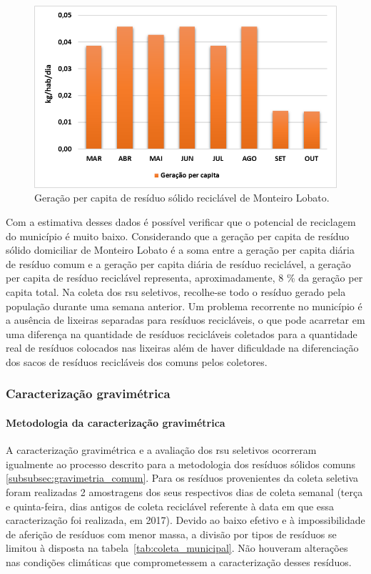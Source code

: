 	\begin{figure}
		\centering
		\includegraphics[width=0.75\linewidth]{produtos/prodtres/image049}
		\caption{Geração per capita de resíduo sólido reciclável de Monteiro Lobato.}
		\label{fig:image049}
	\end{figure}
	
	
	Com a estimativa desses dados é possível verificar que o potencial de reciclagem do município é muito baixo. Considerando que a geração per capita de resíduo sólido domiciliar de Monteiro Lobato é a soma entre a geração per capita diária de resíduo comum e a geração per capita diária de resíduo reciclável, a geração per capita de resíduo reciclável representa, aproximadamente, 8 \% da geração per capita total.
	Na coleta dos \gls{rsu} seletivos, recolhe-se todo o resíduo gerado pela população durante uma semana anterior. Um problema recorrente no município é a ausência de lixeiras separadas para resíduos recicláveis, o que pode acarretar em uma diferença na quantidade de resíduos recicláveis coletados para a quantidade real de resíduos colocados nas lixeiras além de haver dificuldade na diferenciação dos sacos de resíduos recicláveis dos comuns pelos coletores.
	
	\subsubsection{Caracterização gravimétrica}
	
	\paragraph{\textbf{Metodologia da caracterização gravimétrica}}
	
	A caracterização gravimétrica e a avaliação dos \gls{rsu} seletivos ocorreram igualmente ao processo descrito para a metodologia dos resíduos sólidos comuns \ref{subsubsec:gravimetria_comum}. Para os resíduos provenientes da coleta seletiva foram realizadas 2 amostragens dos seus respectivos dias de coleta semanal (terça e quinta-feira, dias antigos de coleta reciclável referente à data em que essa caracterização foi realizada, em 2017). Devido ao baixo efetivo e à impossibilidade de aferição de resíduos com menor massa, a divisão por tipos de resíduos se limitou à disposta na tabela~\ref{tab:coleta_municipal}. Não houveram alterações nas condições climáticas que comprometessem a caracterização desses resíduos.
	
